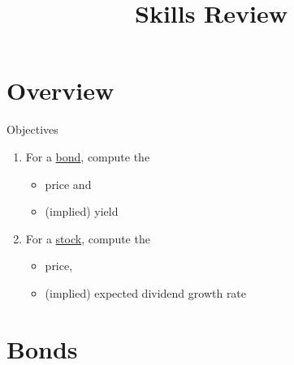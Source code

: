 \documentclass{beamer}
\title{Skills Review}
\begin{document}
\maketitle

\section{Overview}

\begin{frame}{Objectives}
	\begin{enumerate}
		\item For a \underline{bond}, compute the
			\begin{itemize}
				\item price and 
				\item (implied) yield
			\end{itemize}
		\item For a \underline{stock}, compute the
			\begin{itemize}
				\item price,
				\item (implied) expected dividend growth rate
			\end{itemize}
	\end{enumerate}
\end{frame}

\section{Bonds}
\end{document}

